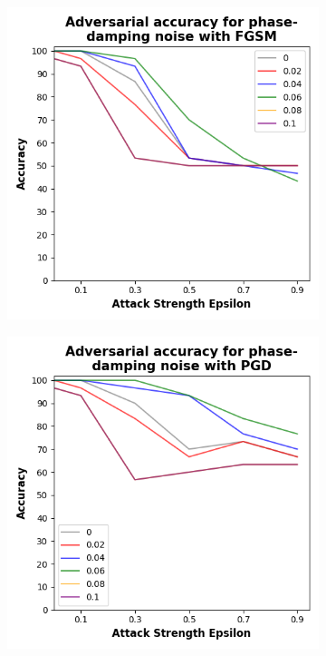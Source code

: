 \begin{figure}[!h]
  \begin{subfigure}{0.45\textwidth}
      \includegraphics[width=\linewidth]{figures/evaluation_results/iris/pqc/figures/phase-damping-fgsm.png}
      \label{fig:iris13}
  \end{subfigure} \qquad
  \begin{subfigure}{0.45\textwidth}
      \includegraphics[width=\linewidth]{figures/evaluation_results/iris/pqc/figures/phase-damping-pgd.png}
      \label{fig:iris14}
  \end{subfigure}


\end{figure}
